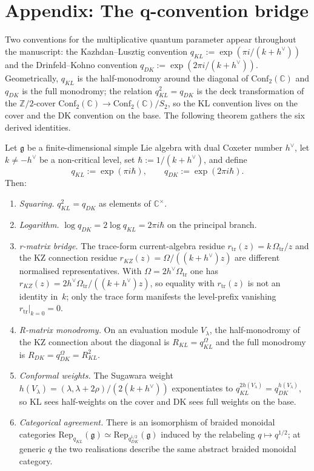 \chapter{Appendix: The q-convention bridge}
\label{app:q-conventions}

Two conventions for the multiplicative quantum parameter appear throughout the manuscript: the Kazhdan--Lusztig convention $q_{KL} := \exp(\pi i/(k+h^\vee))$ and the Drinfeld--Kohno convention $q_{DK} := \exp(2\pi i/(k+h^\vee))$. Geometrically, $q_{KL}$ is the half-monodromy around the diagonal of $\mathrm{Conf}_2(\mathbb{C})$ and $q_{DK}$ is the full monodromy; the relation $q_{KL}^2 = q_{DK}$ is the deck transformation of the $\mathbb{Z}/2$-cover $\mathrm{Conf}_2(\mathbb{C}) \to \mathrm{Conf}_2(\mathbb{C})/S_2$, so the KL convention lives on the cover and the DK convention on the base. The following theorem gathers the six derived identities.

\begin{theorem}
\label{thm:q-convention-bridge}
Let $\mathfrak{g}$ be a finite-dimensional simple Lie algebra with dual Coxeter number $h^\vee$, let $k \neq -h^\vee$ be a non-critical level, set $\hbar := 1/(k+h^\vee)$, and define
\[
q_{KL} := \exp(\pi i \hbar), \qquad q_{DK} := \exp(2\pi i \hbar).
\]
Then:
\begin{enumerate}
\item[(i)] \emph{Squaring.} $q_{KL}^2 = q_{DK}$ as elements of $\mathbb{C}^\times$.
\item[(ii)] \emph{Logarithm.} $\log q_{DK} = 2\log q_{KL} = 2\pi i \hbar$ on the principal branch.
\item[(iii)] \emph{r-matrix bridge.} The trace-form current-algebra residue
$r_{\mathrm{tr}}(z)=k\,\Omega_{\mathrm{tr}}/z$ and the KZ connection
residue $r_{KZ}(z)=\Omega/((k+h^\vee)z)$ are different normalised
representatives. With $\Omega=2h^\vee\Omega_{\mathrm{tr}}$ one has
$r_{KZ}(z)=2h^\vee\Omega_{\mathrm{tr}}/((k+h^\vee)z)$, so equality with
$r_{\mathrm{tr}}(z)$ is not an identity in~$k$; only the trace form
manifests the level-prefix vanishing $r_{\mathrm{tr}}\big|_{k=0}=0$.
\item[(iv)] \emph{R-matrix monodromy.} On an evaluation module $V_\lambda$, the half-monodromy of the KZ connection about the diagonal is $R_{KL} = q_{KL}^\Omega$ and the full monodromy is $R_{DK} = q_{DK}^\Omega = R_{KL}^2$.
\item[(v)] \emph{Conformal weights.} The Sugawara weight $h(V_\lambda) = (\lambda,\lambda+2\rho)/(2(k+h^\vee))$ exponentiates to $q_{KL}^{2h(V_\lambda)} = q_{DK}^{h(V_\lambda)}$, so KL sees half-weights on the cover and DK sees full weights on the base.
\item[(vi)] \emph{Categorical agreement.} There is an isomorphism of braided monoidal categories $\mathrm{Rep}_{q_{KL}}(\mathfrak{g}) \simeq \mathrm{Rep}_{q_{DK}^{1/2}}(\mathfrak{g})$ induced by the relabeling $q \mapsto q^{1/2}$; at generic $q$ the two realisations describe the same abstract braided monoidal category.
\end{enumerate}
\end{theorem}

